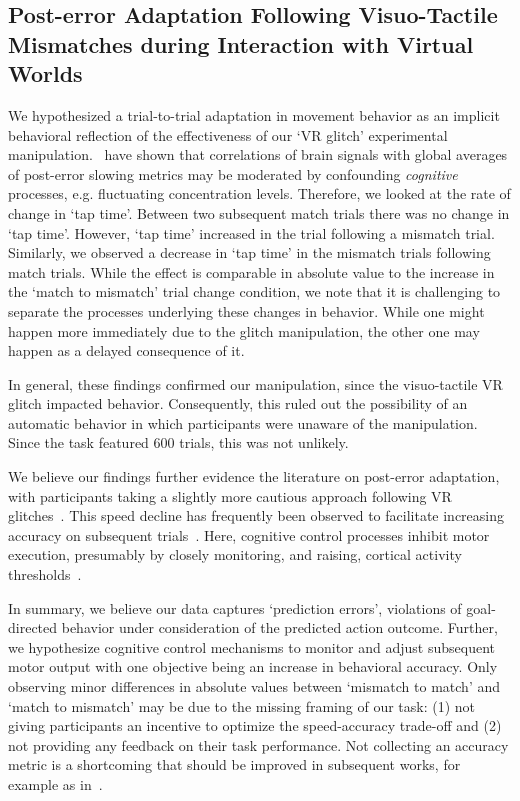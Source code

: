 \subsection{Post-error Adaptation Following Visuo-Tactile Mismatches during Interaction with Virtual Worlds}

We hypothesized a trial-to-trial adaptation in movement behavior as an implicit behavioral reflection of the effectiveness of our `VR glitch' experimental manipulation.~\cite{Dutilh2012-ps} have shown that correlations of brain signals with global averages of post-error slowing metrics may be moderated by confounding \textit{cognitive} processes, e.g. fluctuating concentration levels. Therefore, we looked at the rate of change in `tap time'. Between two subsequent match trials there was no change in `tap time'. However, `tap time' increased in the trial following a mismatch trial. Similarly, we observed a decrease in `tap time' in the mismatch trials following match trials. While the effect is comparable in absolute value to the increase in the `match to mismatch' trial change condition, we note that it is challenging to separate the processes underlying these changes in behavior. While one might happen more immediately due to the glitch manipulation, the other one may happen as a delayed consequence of it.

In general, these findings confirmed our manipulation, since the visuo-tactile VR glitch impacted behavior. Consequently, this ruled out the possibility of an automatic behavior in which participants were unaware of the manipulation. Since the task featured 600 trials, this was not unlikely. 

We believe our findings further evidence the literature on post-error adaptation, with participants taking a slightly more cautious approach following VR glitches~\cite{Rabbitt1977-yg}. This speed decline has frequently been observed to facilitate increasing accuracy on subsequent trials~\cite{Ridderinkhof2004-rz}. Here, cognitive control processes inhibit motor execution, presumably by closely monitoring, and raising, cortical activity thresholds~\cite{Botvinick2001-bs}.

In summary, we believe our data captures `prediction errors', violations of goal-directed behavior under consideration of the predicted action outcome. Further, we hypothesize cognitive control mechanisms to monitor and adjust subsequent motor output with one objective being an increase in behavioral accuracy. Only observing minor differences in absolute values between `mismatch to match' and `match to mismatch' may be due to the missing framing of our task: (1) not giving participants an incentive to optimize the speed-accuracy trade-off and (2) not providing any feedback on their task performance. Not collecting an accuracy metric is a shortcoming that should be improved in subsequent works, for example as in~\cite{Purcell2016-li}.

